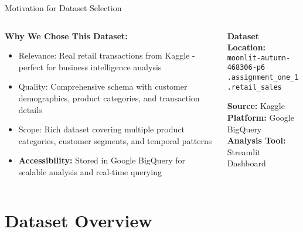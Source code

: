 \documentclass[aspectratio=169]{beamer}
\begin{document}
\begin{frame}{Motivation for Dataset Selection}
\begin{columns}
\begin{column}{0.6\textwidth}
\textbf{Why We Chose This Dataset:}
\begin{itemize}
    \item \textcolor{myblue}{Relevance:} Real retail transactions from Kaggle - perfect for business intelligence analysis
    \item \textcolor{mygreen}{Quality:} Comprehensive schema with customer demographics, product categories, and transaction details
    \item \textcolor{myred}{Scope:} Rich dataset covering multiple product categories, customer segments, and temporal patterns
    \item \textbf{Accessibility:} Stored in Google BigQuery for scalable analysis and real-time querying
\end{itemize}
\end{column}
\begin{column}{0.4\textwidth}
\begin{center}
\textbf{Dataset Location:}\\
\texttt{moonlit-autumn-468306-p6}\\
\texttt{.assignment\_one\_1}\\
\texttt{.retail\_sales}

\vspace{0.5cm}
\textbf{Source:} Kaggle\\
\textbf{Platform:} Google BigQuery\\
\textbf{Analysis Tool:} Streamlit Dashboard
\end{center}
\end{column}
\end{columns}
\end{frame}

\section{Dataset Overview}
\end{document}
